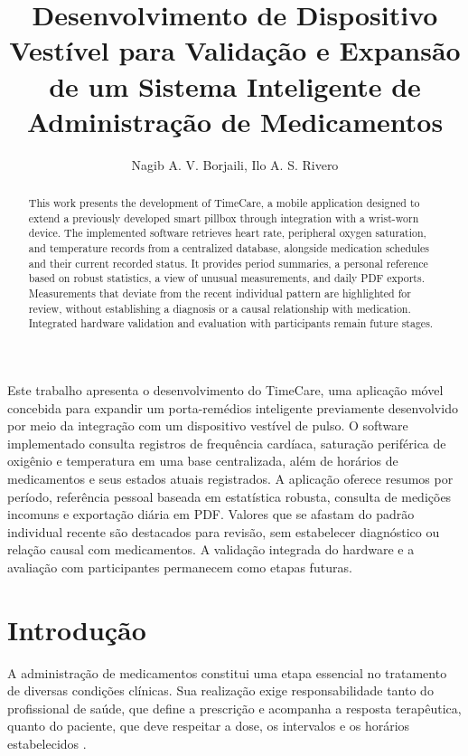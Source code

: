 \documentclass[12pt]{article}
\title{Desenvolvimento de Dispositivo Vestível para Validação e Expansão de um Sistema Inteligente de Administração de Medicamentos}
\author{Nagib A. V. Borjaili\inst{1}, Ilo A. S. Rivero\inst{1}}
\begin{document}
\maketitle

\begin{abstract}
This work presents the development of TimeCare, a mobile application designed to extend a previously developed smart pillbox through integration with a wrist-worn device. The implemented software retrieves heart rate, peripheral oxygen saturation, and temperature records from a centralized database, alongside medication schedules and their current recorded status. It provides period summaries, a personal reference based on robust statistics, a view of unusual measurements, and daily PDF exports. Measurements that deviate from the recent individual pattern are highlighted for review, without establishing a diagnosis or a causal relationship with medication. Integrated hardware validation and evaluation with participants remain future stages.
\end{abstract}

\begin{resumo}
Este trabalho apresenta o desenvolvimento do TimeCare, uma aplicação móvel concebida para expandir um porta-remédios inteligente previamente desenvolvido por meio da integração com um dispositivo vestível de pulso. O software implementado consulta registros de frequência cardíaca, saturação periférica de oxigênio e temperatura em uma base centralizada, além de horários de medicamentos e seus estados atuais registrados. A aplicação oferece resumos por período, referência pessoal baseada em estatística robusta, consulta de medições incomuns e exportação diária em PDF. Valores que se afastam do padrão individual recente são destacados para revisão, sem estabelecer diagnóstico ou relação causal com medicamentos. A validação integrada do hardware e a avaliação com participantes permanecem como etapas futuras.
\end{resumo}

\section{Introdução}

A administração de medicamentos constitui uma etapa essencial no tratamento de diversas condições clínicas. Sua realização exige responsabilidade tanto do profissional de saúde, que define a prescrição e acompanha a resposta terapêutica, quanto do paciente, que deve respeitar a dose, os intervalos e os horários estabelecidos \cite{aremu2022medication}.
\end{document}
